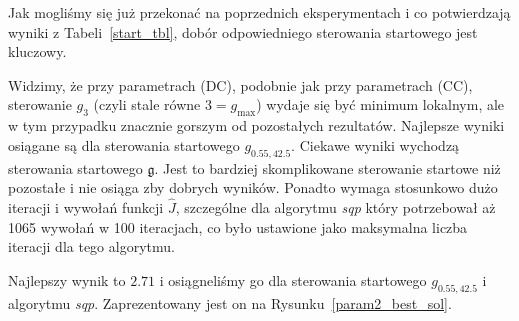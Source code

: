 \documentclass[11pt]{article}
\begin{document}
Jak mogliśmy się już przekonać na poprzednich eksperymentach i co potwierdzają wyniki z Tabeli~\ref{start_tbl}, dobór odpowiedniego sterowania startowego jest kluczowy.

Widzimy, że przy parametrach (DC), podobnie jak przy parametrach (CC), sterowanie $g_3$ (czyli stale równe $3 = g_{\max}$) wydaje się być minimum lokalnym, ale w tym przypadku znacznie gorszym od pozostałych rezultatów. Najlepsze wyniki osiągane są dla sterowania startowego $g_{0.55,42.5}$. Ciekawe wyniki wychodzą sterowania startowego $\mathfrak{g}$. Jest to bardziej skomplikowane sterowanie startowe niż pozostałe i nie osiąga zby dobrych wyników. Ponadto wymaga stosunkowo dużo iteracji i wywołań funkcji $\hat{J}$, szczególne dla algorytmu {\it sqp\/} który potrzebował aż 1065 wywołań w 100 iteracjach, co było ustawione jako maksymalna liczba iteracji dla tego algorytmu.

Najlepszy wynik to $2.71$ i osiągneliśmy go dla sterowania startowego $g_{0.55,42.5}$ i algorytmu {\it sqp}. Zaprezentowany jest on na Rysunku~\ref{param2_best_sol}.
\end{document}
